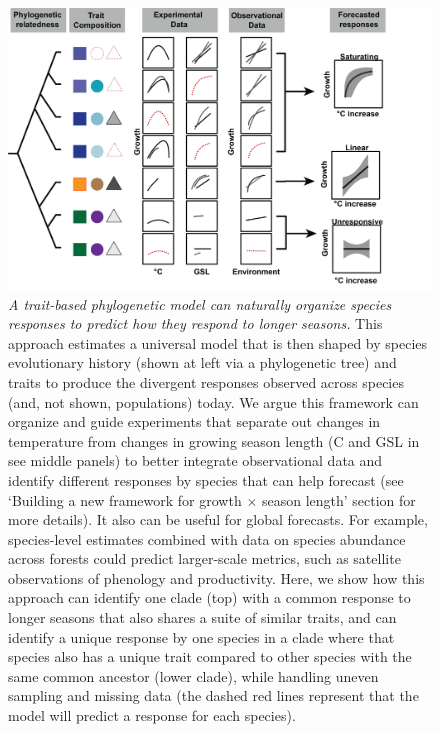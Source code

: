 \documentclass[11pt]{article}
\begin{document}
\clearpage
\begin{figure}[h!]
\includegraphics[width=1\textwidth]{..//figures/phylomodel/phylomodel.png}
\caption{\emph{A trait-based phylogenetic model can naturally organize species responses to predict how they respond to longer seasons.} This approach estimates a universal model that is then shaped by species evolutionary history (shown at left via a phylogenetic tree) and traits to produce the divergent responses observed across species (and, not shown, populations) today. We argue this framework can organize and guide experiments that separate out changes in temperature from changes in growing season length (\degree C and GSL in see middle panels) to better integrate observational data and identify different responses by species that can help forecast (see `Building a new framework for growth $\times$ season length' section for more details). It also can be useful for global forecasts. For example, species-level estimates combined with data on species abundance across forests \citep[e.g.][]{FIA,fischer2019swiss} could predict larger-scale metrics, such as satellite observations of phenology and productivity. Here, we show how this approach can identify one clade (top) with a common response to longer seasons that also shares a suite of similar traits, and can identify a unique response by one species in a clade where that species also has a unique trait compared to other species with the same common ancestor (lower clade), while handling uneven sampling and missing data (the dashed red lines represent that the model will predict a response for each species). }  %
\label{fig:phylomodel}
\end{figure}
\end{document}
